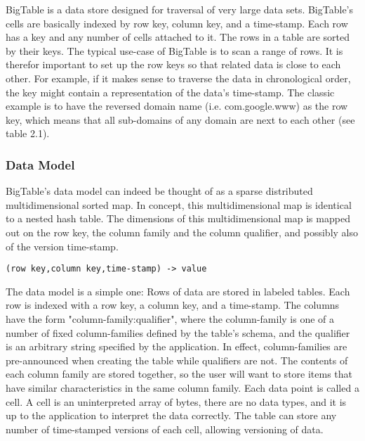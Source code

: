 BigTable is a data store designed for traversal of very large data sets.
BigTable's cells are basically indexed by row key, column key, and a time-stamp.
Each row has a key and any number of cells attached to it. The rows in a table
are sorted by their keys. The typical use-case of BigTable is to scan a range of
rows. It is therefor important to set up the row keys so that related data is
close to each other. For example, if it makes sense to traverse the data in
chronological order, the key might contain a representation of the data's
time-stamp. The classic example is to have the reversed domain name (i.e.
com.google.www) as the row key, which means that all sub-domains of any domain
are next to each other (see table 2.1).


\subsubsection{Data Model}

BigTable's data model can indeed be thought of as a sparse distributed
multidimensional sorted map. In concept, this multidimensional map is identical
to a nested hash table. The dimensions of this multidimensional map is mapped
out on the row key, the column family and the column qualifier, and possibly
also of the version time-stamp.

\vspace{12pt}

\begin{lstlisting}[caption=BigTable data model illustration.,captionpos=b]
   (row key,column key,time-stamp) -> value
\end{lstlisting}

\vspace{12pt}

The data model is a simple one: Rows of data are stored in labeled tables. Each
row is indexed with a row key, a column key, and a time-stamp. The columns have
the form "column-family:qualifier", where the column-family is one of a number
of fixed column-families defined by the table's schema, and the qualifier is an
arbitrary string specified by the application. In effect, column-families are
pre-announced when creating the table while qualifiers are not. The contents of
each column family are stored together, so the user will want to store items
that have similar characteristics in the same column family.  Each data point is
called a cell. A cell is an uninterpreted array of bytes, there are no data
types, and it is up to the application to interpret the data correctly. The
table can store any number of time-stamped versions of each cell, allowing
versioning of data.

